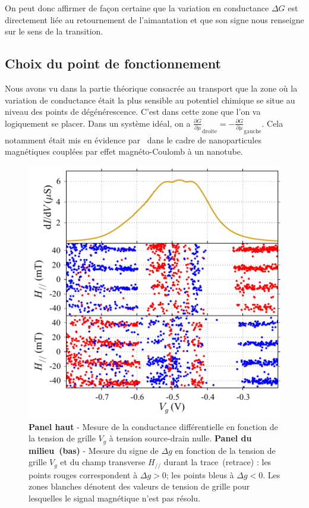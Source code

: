 On peut donc affirmer de façon certaine que la variation en conductance $\Delta G$ est directement liée au retournement de l'aimantation et que son signe nous renseigne sur le sens de la transition.

\subsection{Choix du point de fonctionnement}
Nous avons vu dans la partie théorique consacrée au transport que la zone où la variation de conductance était la plus sensible au potentiel chimique se situe au niveau des points de dégénérescence. C'est dans cette zone que l'on va logiquement se placer. Dans un système idéal, on a $\frac{\partial G}{\partial \mu}_{\text{droite}} = -\frac{\partial G}{\partial \mu}_{\text{gauche}} $. Cela notamment était mis en évidence par~\cite{Datta2011} dans le cadre de nanoparticules magnétiques couplées par effet magnéto-Coulomb à un nanotube.

\begin{figure}
\parbox{8.2cm}{
\includegraphics[scale=0.45]{Resultats/Chap1/Figure6/figure6.pdf} 
}
\parbox{7cm}{\caption{\textbf{Panel haut} - Mesure de la conductance différentielle en fonction de la tension de grille $V_g$ à tension source-drain nulle. \textbf{Panel du milieu~(bas)} - Mesure du signe de $\Delta g$ en fonction de la tension de grille $V_g$ et du champ transverse $H_{//}$ durant la trace~(retrace) : les points rouges correspondent à $\Delta g >0$; les points bleus à $\Delta g <0$. Les zones blanches dénotent des valeurs de tension de grille pour lesquelles le signal magnétique n'est pas résolu.}
\label{point_fonctio}
}
\end{figure}


